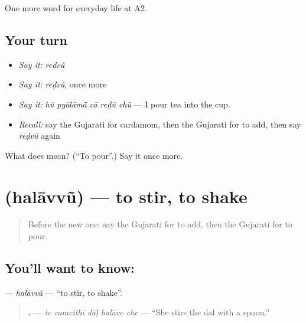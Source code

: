 \begin{grammarlens}[title={What you've built}]
One more word for everyday life at A2.
\end{grammarlens}

\subsection*{Your turn}
\begin{itemize}
\raggedright
  \item \emph{Say it:} \emph{reḍvũ}
  \item \emph{Say it:} \emph{reḍvũ}, once more
  \item \emph{Say it:} \emph{hũ pyālāmā̃ cā reḍũ chũ} — I pour tea into the cup.
  \item \emph{Recall:} say the Gujarati for cardamom, then the Gujarati for to add, then say \emph{reḍvũ} again
\end{itemize}

\begin{tcolorbox}[breakable,colback=teal!4,colframe=teal!35!black,title={Before you move on}]
What does  mean? (\textquotedblleft{}To pour\textquotedblright{}.) Say it once more.
\end{tcolorbox}
\section[\texorpdfstring{\gu{હલાવવું} (halāvvũ)}{હલાવવું (halāvvũ)}]{ (halāvvũ) — to stir, to shake}

\label{lesson:GU-C165-halavvu}



\begin{quote}
Before the new one: say the Gujarati for to add, then the Gujarati for to pour.
\end{quote}

\subsection*{You'll want to know: }
\textbf{} — \emph{halāvvũ} — \textquotedblleft{}to stir, to shake\textquotedblright{}.

\begin{quote}
\textbf{    .} — \emph{te camcīthī dāḷ halāve che} — \textquotedblleft{}She stirs the dal with a spoon.\textquotedblright{}
\end{quote}

